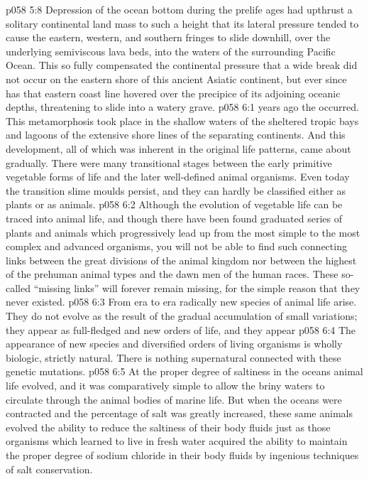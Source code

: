 \vs p058 5:8 Depression of the ocean bottom during the prelife ages had upthrust a solitary continental land mass to such a height that its lateral pressure tended to cause the eastern, western, and southern fringes to slide downhill, over the underlying semiviscous lava beds, into the waters of the surrounding Pacific Ocean. This so fully compensated the continental pressure that a wide break did not occur on the eastern shore of this ancient Asiatic continent, but ever since has that eastern coast line hovered over the precipice of its adjoining oceanic depths, threatening to slide into a watery grave.
\vs p058 6:1  years ago the  occurred. This metamorphosis took place in the shallow waters of the sheltered tropic bays and lagoons of the extensive shore lines of the separating continents. And this development, all of which was inherent in the original life patterns, came about gradually. There were many transitional stages between the early primitive vegetable forms of life and the later well\hyp{}defined animal organisms. Even today the transition slime moulds persist, and they can hardly be classified either as plants or as animals.
\vs p058 6:2 \pc Although the evolution of vegetable life can be traced into animal life, and though there have been found graduated series of plants and animals which progressively lead up from the most simple to the most complex and advanced organisms, you will not be able to find such connecting links between the great divisions of the animal kingdom nor between the highest of the prehuman animal types and the dawn men of the human races. These so\hyp{}called “missing links” will forever remain missing, for the simple reason that they never existed.
\vs p058 6:3 From era to era radically new species of animal life arise. They do not evolve as the result of the gradual accumulation of small variations; they appear as full\hyp{}fledged and new orders of life, and they appear 
\vs p058 6:4 The  appearance of new species and diversified orders of living organisms is wholly biologic, strictly natural. There is nothing supernatural connected with these genetic mutations.
\vs p058 6:5 At the proper degree of saltiness in the oceans animal life evolved, and it was comparatively simple to allow the briny waters to circulate through the animal bodies of marine life. But when the oceans were contracted and the percentage of salt was greatly increased, these same animals evolved the ability to reduce the saltiness of their body fluids just as those organisms which learned to live in fresh water acquired the ability to maintain the proper degree of sodium chloride in their body fluids by ingenious techniques of salt conservation.
